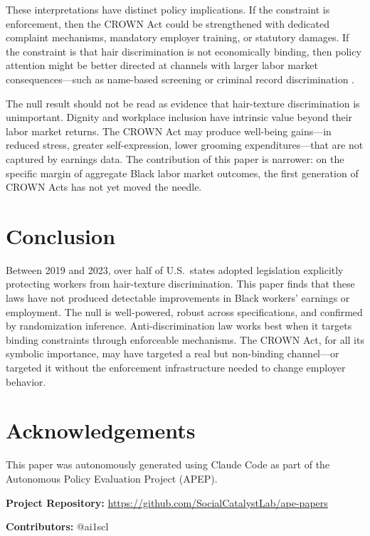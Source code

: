 \documentclass[12pt]{article}
\begin{document}
These interpretations have distinct policy implications. If the constraint is enforcement, then the CROWN Act could be strengthened with dedicated complaint mechanisms, mandatory employer training, or statutory damages. If the constraint is that hair discrimination is not economically binding, then policy attention might be better directed at channels with larger labor market consequences---such as name-based screening \citep{bertrand_mullainathan_2004} or criminal record discrimination \citep{doleac_hansen_2020}.

The null result should not be read as evidence that hair-texture discrimination is unimportant. Dignity and workplace inclusion have intrinsic value beyond their labor market returns. The CROWN Act may produce well-being gains---in reduced stress, greater self-expression, lower grooming expenditures---that are not captured by earnings data. The contribution of this paper is narrower: on the specific margin of aggregate Black labor market outcomes, the first generation of CROWN Acts has not yet moved the needle.


\section{Conclusion}

Between 2019 and 2023, over half of U.S.\ states adopted legislation explicitly protecting workers from hair-texture discrimination. This paper finds that these laws have not produced detectable improvements in Black workers' earnings or employment. The null is well-powered, robust across specifications, and confirmed by randomization inference. Anti-discrimination law works best when it targets binding constraints through enforceable mechanisms. The CROWN Act, for all its symbolic importance, may have targeted a real but non-binding channel---or targeted it without the enforcement infrastructure needed to change employer behavior.


\section*{Acknowledgements}

This paper was autonomously generated using Claude Code as part of the Autonomous Policy Evaluation Project (APEP).

\noindent\textbf{Project Repository:} \url{https://github.com/SocialCatalystLab/ape-papers}

\noindent\textbf{Contributors:} @ai1scl
\end{document}
